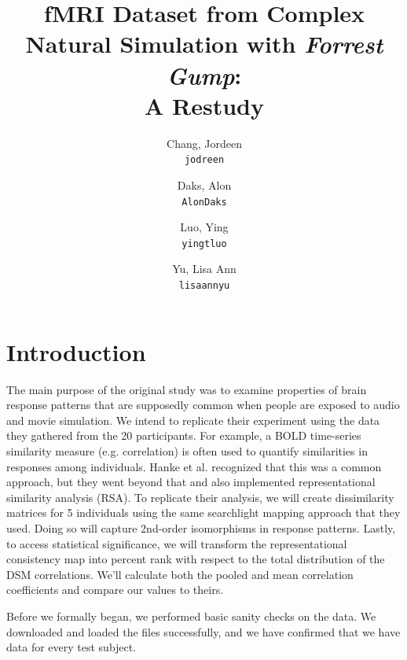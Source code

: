 \documentclass[11pt]{article}
\title{fMRI Dataset from Complex Natural Simulation with \emph{Forrest Gump}: \\A Restudy}
\author{
  Chang, Jordeen\\
  \texttt{jodreen}
  \and
  Daks, Alon\\
  \texttt{AlonDaks}
  \and
  Luo, Ying\\
  \texttt{yingtluo}
  \and
  Yu, Lisa Ann\\
  \texttt{lisaannyu}
}
\begin{document}
\maketitle


\section{Introduction}

The main purpose of the original study was to examine properties of brain
response patterns that are supposedly common when people are exposed to audio
and movie simulation. We intend to replicate their experiment using the data
they gathered from the 20 participants. For example, a BOLD time-series
similarity measure (e.g. correlation) is often used to quantify similarities
in responses among individuals. Hanke et al. recognized that this was a common
approach, but they went beyond that and also implemented representational
similarity analysis (RSA)\cite{hank2014audiomovie}. To replicate their 
analysis, we will create dissimilarity matrices for 5 individuals using the 
same searchlight mapping approach that they used. Doing so will capture 
2nd-order isomorphisms in response patterns. 
Lastly, to access statistical significance, we will transform the 
representational consistency map into percent rank with respect to the total 
distribution of the DSM correlations. We'll calculate both the pooled and mean 
correlation coefficients and compare our values to theirs.

Before we formally began, we performed basic sanity checks on the data. We
downloaded and loaded the files successfully, and we have confirmed that we
have data for every test subject. 
\end{document}
